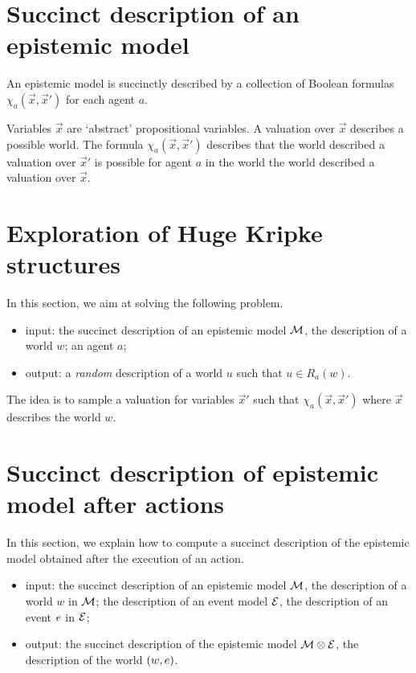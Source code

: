 \documentclass{article}
\begin{document}

\section{Succinct description of an epistemic model}

\begin{definition}
An epistemic model is succinctly described by a collection of Boolean formulas $\chi_a(\vec x, \vec x')$ for each agent $a$.
\end{definition}

Variables $\vec x$ are `abstract' propositional variables. A valuation over $\vec x$ describes a possible world. The formula $\chi_a(\vec x, \vec x')$ describes that the world described a valuation over $\vec x'$ is possible for agent $a$ in the world  the world described a valuation over $\vec x$. 


\section{Exploration of Huge Kripke structures}


In this section, we aim at solving the following problem.

\begin{itemize}
	\item input: the succinct description of an epistemic model $\mathcal M$, the description of a world $w$; an agent $a$;
	\item output: a \emph{random} description of a world $u$ such that $u \in R_a(w)$.
\end{itemize}

The idea is to sample a valuation for variables $\vec x'$ such that $\chi_a(\vec x, \vec x')$ where $\vec x$ describes the world $w$.



\section{Succinct description of epistemic model after actions}

In this section, we explain how to compute a succinct description of the epistemic model obtained after the execution of an action. 

\begin{itemize}
	\item input: the succinct description of an epistemic model $\mathcal M$, the description of a world $w$ in $\mathcal M$; the description of an event model $\mathcal E$, the description of an event $e$ in $\mathcal E$;
	\item output: the succinct description of the epistemic model $\mathcal M \otimes \mathcal E$, the description of the world $(w, e)$.
\end{itemize}
\end{document}
